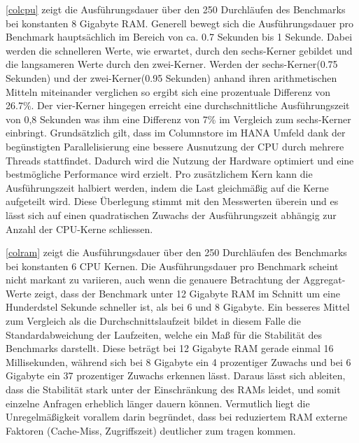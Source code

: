 \autoref{colcpu} zeigt die Ausführungsdauer über den 250 Durchläufen des Benchmarks bei konstanten 8 Gigabyte RAM. 
Generell bewegt sich die Ausführungsdauer pro Benchmark hauptsächlich im Bereich von ca. 0.7 Sekunden bis 1 Sekunde. 
Dabei werden die schnelleren Werte, wie erwartet, durch den sechs-Kerner gebildet und die langsameren Werte durch den zwei-Kerner. 
Werden der sechs-Kerner(0.75 Sekunden) und der zwei-Kerner(0.95 Sekunden) anhand ihren arithmetischen Mitteln miteinander 
verglichen so ergibt sich eine prozentuale Differenz von 26.7\%. Der vier-Kerner hingegen erreicht eine durchschnittliche 
Ausführungszeit von 0,8 Sekunden was ihm eine Differenz von 7\% im Vergleich zum sechs-Kerner einbringt. 
Grundsätzlich gilt, dass im Columnstore im HANA Umfeld dank der begünstigten Parallelisierung eine bessere Ausnutzung der 
CPU durch mehrere Threads stattfindet. Dadurch wird die Nutzung der Hardware optimiert und eine bestmögliche Performance 
wird erzielt. Pro zusätzlichem Kern kann die Ausführungszeit halbiert werden, indem die Last gleichmäßig auf die Kerne 
aufgeteilt wird. Diese Überlegung stimmt mit den Messwerten überein und es lässt sich auf einen quadratischen Zuwachs 
der Ausführungszeit abhängig zur Anzahl der CPU-Kerne schliessen. 

\begin{figure}[H]
\end{figure}

\autoref{colram} zeigt die Ausführungsdauer über den 250 Durchläufen des Benchmarks bei konstanten 6 CPU Kernen. 
Die Ausführungsdauer pro Benchmark scheint nicht markant zu variieren, auch wenn die genauere Betrachtung der Aggregat-Werte zeigt,
 dass der Benchmark unter 12 Gigabyte RAM im Schnitt um eine Hunderdstel Sekunde schneller ist, als bei 6 und 8 Gigabyte.
 Ein besseres Mittel zum Vergleich als die Durchschnittslaufzeit bildet in diesem Falle die Standardabweichung der Laufzeiten, 
 welche ein Maß für die Stabilität des Benchmarks darstellt. Diese beträgt bei 12 Gigabyte RAM gerade einmal 16 Millisekunden, 
 während sich bei 8 Gigabyte ein 4 prozentiger Zuwachs und bei 6 Gigabyte ein 37 prozentiger Zuwachs erkennen lässt. 
 Daraus lässt sich ableiten, dass die Stabilität stark unter der Einschränkung des RAMs leidet, und somit einzelne Anfragen erheblich länger dauern können. 
 Vermutlich liegt die Unregelmäßigkeit vorallem darin begründet, dass bei reduziertem RAM externe Faktoren (Cache-Miss, Zugriffszeit) deutlicher zum tragen kommen. 

